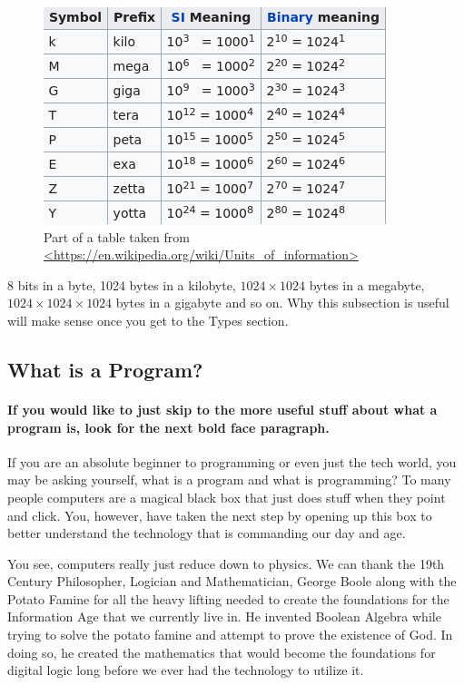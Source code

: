 \documentclass[11]{article}
\begin{document}
\begin{figure}[H]
	\centering
	\includegraphics[scale=0.75]{sizes.png}
	\caption{Part of a table taken from \url{<https://en.wikipedia.org/wiki/Units_of_information>}}
\end{figure}

8 bits in a byte, 1024 bytes in a kilobyte, $1024 \times 1024$ bytes in a megabyte, $1024 \times 1024 \times 1024$ bytes in a gigabyte and so on. Why this subsection is useful will make sense once you get to the Types section.

\subsection{What is a Program?}
\paragraph{If you would like to just skip to the more useful stuff about what a program is, look for the next bold face paragraph.}
If you are an absolute beginner to programming or even just the tech world, you may be asking yourself, what is a program and what is programming? To many people computers are a magical black box that just does stuff when they point and click. You, however, have taken the next step by opening up this box to better understand the technology that is commanding our day and age.

You see, computers really just reduce down to physics. We can thank the 19th Century Philosopher, Logician and Mathematician, George Boole along with the Potato Famine for all the heavy lifting needed to create the foundations for the Information Age that we currently live in. He invented Boolean Algebra while trying to solve the potato famine and attempt to prove the existence of God. In doing so, he created the mathematics that would become the foundations for digital logic long before we ever had the technology to utilize it.\\
\end{document}
